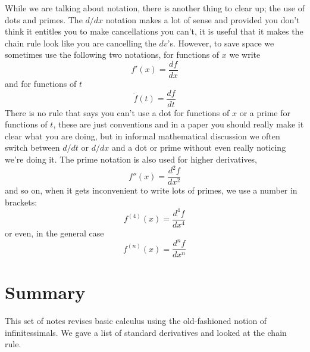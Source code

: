 \documentclass[12pt]{article}
\begin{document}
While we are talking about notation, there is another thing to clear
up; the use of dots and primes. The $d/dx$ notation makes a lot of
sense and provided you don't think it entitles you to make
cancellations you can't, it is useful that it makes the chain rule
look like you are cancelling the $dv$'s. However, to save space we
sometimes use the following two notations, for functions of $x$ we write
\begin{equation}
  f'(x)=\frac{df}{dx}
\end{equation}
and for functions of $t$
\begin{equation}
  \dot{f}(t)=\frac{df}{dt}
\end{equation}
There is no rule that says you can't use a dot for functions of $x$ or
a prime for functions of $t$, these are just conventions and in a
paper you should really make it clear what you are doing, but in
informal mathematical discussion we often switch between $d/dt$ or
$d/dx$ and a dot or prime without even really noticing we're doing
it. The prime notation is also used for higher derivatives,
\begin{equation}
  f''(x)=\frac{d^2f}{dx^2}
\end{equation}
and so on, when it gets inconvenient to write lots of primes, we use a number in brackets:
\begin{equation}
  f^{(4)}(x)=\frac{d^4f}{dx^4}
\end{equation}
or even, in the general case
\begin{equation}
  f^{(n)}(x)=\frac{d^nf}{dx^n}
\end{equation}

\section*{Summary}

This set of notes revises basic calculus using the old-fashioned
notion of infinitessimals. We gave a list of standard derivatives and
looked at the chain rule. 
\end{document}
